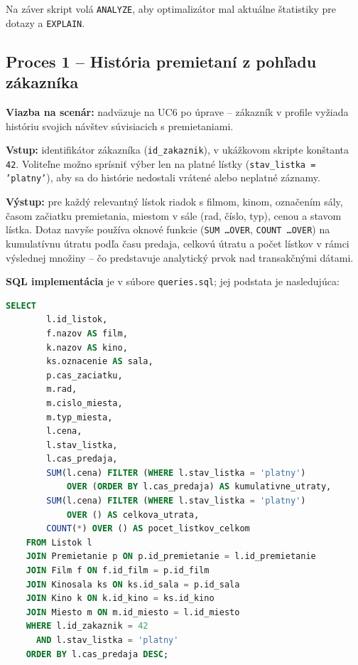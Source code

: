 \documentclass[11pt, a4paper]{article}
\begin{document}
Na záver skript volá \texttt{ANALYZE}, aby optimalizátor mal aktuálne štatistiky pre dotazy a \texttt{EXPLAIN}.

\subsection{Proces 1 -- História premietaní z pohľadu zákazníka}

\textbf{Viazba na scenár:} nadväzuje na UC6 po úprave -- zákazník v profile vyžiada históriu svojich návštev súvisiacich s premietaniami.

\textbf{Vstup:} identifikátor zákazníka (\texttt{id\_zakaznik}), v ukážkovom skripte konštanta \texttt{42}.
Voliteľne možno sprísniť výber len na platné lístky (\texttt{stav\_listka = 'platny'}), aby sa do histórie nedostali vrátené alebo neplatné záznamy.

\textbf{Výstup:} pre každý relevantný lístok riadok s filmom, kinom, označením sály, časom začiatku premietania, miestom v sále (rad, číslo, typ), cenou a stavom lístka.
Dotaz navyše používa oknové funkcie (\texttt{SUM \ldots OVER}, \texttt{COUNT \ldots OVER}) na kumulatívnu útratu podľa času predaja, celkovú útratu a počet lístkov v rámci výslednej množiny -- čo predstavuje analytický prvok nad transakčnými dátami.

\textbf{SQL implementácia} je v súbore \texttt{queries.sql}; jej podstata je nasledujúca:

\begin{lstlisting}[language=SQL, caption={História premietaní pre konkrétneho zákazníka (PostgreSQL)}]
    SELECT
        l.id_listok,
        f.nazov AS film,
        k.nazov AS kino,
        ks.oznacenie AS sala,
        p.cas_zaciatku,
        m.rad,
        m.cislo_miesta,
        m.typ_miesta,
        l.cena,
        l.stav_listka,
        l.cas_predaja,
        SUM(l.cena) FILTER (WHERE l.stav_listka = 'platny')
            OVER (ORDER BY l.cas_predaja) AS kumulativne_utraty,
        SUM(l.cena) FILTER (WHERE l.stav_listka = 'platny')
            OVER () AS celkova_utrata,
        COUNT(*) OVER () AS pocet_listkov_celkom
    FROM Listok l
    JOIN Premietanie p ON p.id_premietanie = l.id_premietanie
    JOIN Film f ON f.id_film = p.id_film
    JOIN Kinosala ks ON ks.id_sala = p.id_sala
    JOIN Kino k ON k.id_kino = ks.id_kino
    JOIN Miesto m ON m.id_miesto = l.id_miesto
    WHERE l.id_zakaznik = 42
      AND l.stav_listka = 'platny'
    ORDER BY l.cas_predaja DESC;
\end{lstlisting}
\end{document}
